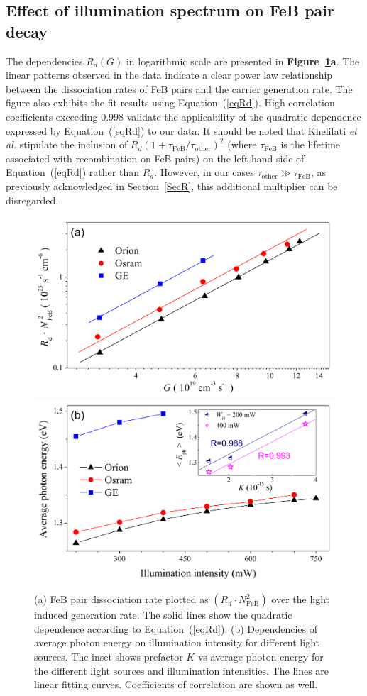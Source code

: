 \documentclass{WileyMSP-template}
\begin{document}
\subsection{Effect of illumination spectrum on FeB pair decay}\label{SecLast}

The dependencies $R_d (G)$ in logarithmic scale are presented in \textbf{Figure~\ref{fig6}a}.
The linear patterns observed in the data indicate a clear power law relationship between
the dissociation rates of FeB pairs and the carrier generation rate.
The figure also exhibits the fit results using Equation~(\ref{eqRd}).
High correlation coefficients exceeding 0.998 validate the applicability of the quadratic dependence expressed by Equation~(\ref{eqRd}) to our data.
It should be noted that Khelifati \emph{et al.} \cite{FeBKin2019} stipulate the inclusion of
$R_d\left(1+\tau_\mathrm{FeB}/\tau_\mathrm{other}\right)^2$ (where $\tau_\mathrm{FeB}$ is the lifetime associated with recombination on FeB pairs)
on the left-hand side of Equation~(\ref{eqRd}) rather than $R_d$.
However, in our cases $\tau_\mathrm{other}\gg \tau_\mathrm{FeB}$, as previously acknowledged in Section~\ref{SecR},
this additional multiplier can be disregarded.


\begin{figure}
\centering
  \includegraphics[width=0.4\linewidth]{Fig6a.png}
  \includegraphics[width=0.4\linewidth]{Fig6b.png}
  \caption{
  (a) FeB pair dissociation rate plotted as $\left(R_d\cdot N_\mathrm{FeB}^2\right)$ over the light induced
  generation rate. The solid lines show the quadratic dependence according to Equation~(\ref{eqRd}).
  (b) Dependencies of average photon energy on illumination intensity for different light sources.
  The inset shows prefactor $K$ vs average photon energy for the different light sources and illumination intensities.
  The lines are linear fitting curves. Coefficients of correlation are shown as well.
  }
  \label{fig6}
\end{figure}
\end{document}
